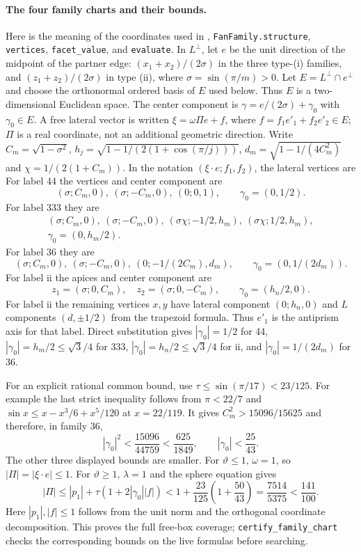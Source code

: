 \documentclass[11pt]{article}
\theoremstyle{definition}
\theoremstyle{remark}
\newcommand{\file}[1]{\path{#1}}
\begin{document}
\paragraph{The four family charts and their bounds.}
Here is the meaning of the coordinates used in
\file{checks/check_caseb/fans.py}, \texttt{FanFamily.structure},
\texttt{vertices}, \texttt{facet\_value}, and \texttt{evaluate}.
In $L^\perp$, let $e$ be the unit direction of the midpoint of the
partner edge: $(x_1+x_2)/(2\sigma)$ in the three type-(i) families,
and $(z_1+z_2)/(2\sigma)$ in type (ii), where
$\sigma=\sin(\pi/m)>0$.
Let $E=L^\perp\cap e^\perp$ and choose the orthonormal ordered basis of
$E$ used below. Thus $E$ is a two-dimensional Euclidean space.
The center component is
$\gamma=e/(2\sigma)+\gamma_0$ with $\gamma_0\in E$.
A free lateral vector is written
$\xi=\omega\Pi e+f$, where $f=f_1e'_1+f_2e'_2\in E$;
$\Pi$ is a real coordinate, not an additional geometric direction.
Write $C_m=\sqrt{1-\sigma^2}$,
$h_j=\sqrt{1-1/(2(1+\cos(\pi/j)))}$,
$d_m=\sqrt{1-1/(4C_m^2)}$ and
$\chi=1/(2(1+C_m))$.
In the notation $(\xi\cdot e;f_1,f_2)$, the lateral vertices are
For label 44 the vertices and center component are
\[
 (\sigma;C_m,0),\ (\sigma;-C_m,0),\ (0;0,1),
 \qquad \gamma_0=(0,1/2).
\]
For label 333 they are
\[
\begin{gathered}
 (\sigma;C_m,0),\ (\sigma;-C_m,0),\
 (\sigma\chi;-1/2,h_m),\ (\sigma\chi;1/2,h_m),\\
 \gamma_0=(0,h_m/2).
\end{gathered}
\]
For label 36 they are
\[
 (\sigma;C_m,0),\ (\sigma;-C_m,0),\
 (0;-1/(2C_m),d_m),\qquad \gamma_0=(0,1/(2d_m)).
\]
For label ii the apices and center component are
\[
 z_1=(\sigma;0,C_m),\quad z_2=(\sigma;0,-C_m),
 \qquad \gamma_0=(h_n/2,0).
\]
For label ii the remaining vertices $x,y$ have lateral component
$(0;h_n,0)$ and $L$ components $(d,\pm1/2)$ from the trapezoid formula.
Thus $e'_1$ is the antiprism axis for that label.
Direct substitution gives
$|\gamma_0|=1/2$ for 44,
$|\gamma_0|=h_m/2\le\sqrt3/4$ for 333,
$|\gamma_0|=h_n/2\le\sqrt3/4$ for ii, and
$|\gamma_0|=1/(2d_m)$ for 36.

For an explicit rational common bound, use
$\tau\le\sin(\pi/17)<23/125$. For example the last strict inequality
follows from $\pi<22/7$ and
$\sin x\le x-x^3/6+x^5/120$ at $x=22/119$.
It gives $C_m^2>15096/15625$ and therefore, in family 36,
\[
 |\gamma_0|^2<\frac{15096}{44759}<\frac{625}{1849},
 \qquad |\gamma_0|<\frac{25}{43}.
\]
The other three displayed bounds are smaller. For $\vartheta\le1$,
$\omega=1$, so $|\Pi|=|\xi\cdot e|\le1$.
For $\vartheta\ge1$, $\lambda=1$ and the sphere equation gives
\[
 |\Pi|\le |p_1|+\tau(1+2|\gamma_0||f|)
 <1+\frac{23}{125}\left(1+\frac{50}{43}\right)
 =\frac{7514}{5375}<\frac{141}{100}.
\]
Here $|p_1|,|f|\le1$ follows from the unit norm and the orthogonal
coordinate decomposition. This proves the full free-box coverage;
\texttt{certify\_family\_chart} checks the corresponding bounds on
the live formulas before searching.
\end{document}
